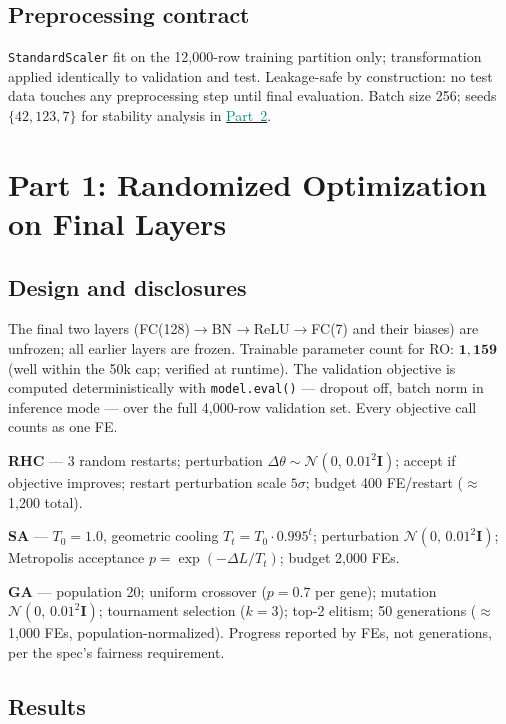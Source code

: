 \documentclass[conference]{IEEEtran}
\newcommand{\partref}[2]{\hyperref[#2]{\textcolor{teal}{Part~#1}}}
\begin{document}
\subsection{Preprocessing contract}\label{sec:data:preprocess}
\texttt{StandardScaler} fit on the 12{,}000-row training partition only;
transformation applied identically to validation and test.
Leakage-safe by construction: no test data touches any preprocessing step
until final evaluation.
Batch size 256; seeds $\{42, 123, 7\}$ for stability analysis in \partref{2}{sec:p2}.

\section{Part 1: Randomized Optimization on Final Layers}\label{sec:p1}

\subsection{Design and disclosures}\label{sec:p1:design}
The final two layers (FC(128)$\to$BN$\to$ReLU$\to$FC(7) and their biases)
are unfrozen; all earlier layers are frozen.
Trainable parameter count for RO: $\mathbf{1{,}159}$
(well within the 50k cap; verified at runtime).
The validation objective is computed deterministically with
\texttt{model.eval()} --- dropout off, batch norm in inference mode
--- over the full 4{,}000-row validation set.
Every objective call counts as one FE.

\textbf{RHC} --- 3 random restarts; perturbation $\Delta\theta
\sim\mathcal{N}(0,\,0.01^2\mathbf{I})$; accept if objective improves; restart
perturbation scale $5\sigma$; budget 400 FE/restart ($\approx$1{,}200 total).

\textbf{SA} --- $T_0{=}1.0$, geometric cooling $T_t{=}T_0 \cdot 0.995^t$;
perturbation $\mathcal{N}(0,\,0.01^2\mathbf{I})$;
Metropolis acceptance $p{=}\exp(-\Delta L/T_t)$; budget 2{,}000 FEs.

\textbf{GA} --- population 20; uniform crossover ($p{=}0.7$ per gene);
mutation $\mathcal{N}(0,\,0.01^2\mathbf{I})$; tournament selection ($k{=}3$);
top-2 elitism; 50 generations ($\approx$1{,}000 FEs, population-normalized).
Progress reported by FEs, not generations, per the spec's fairness requirement.

\subsection{Results}\label{sec:p1:results}
\end{document}
